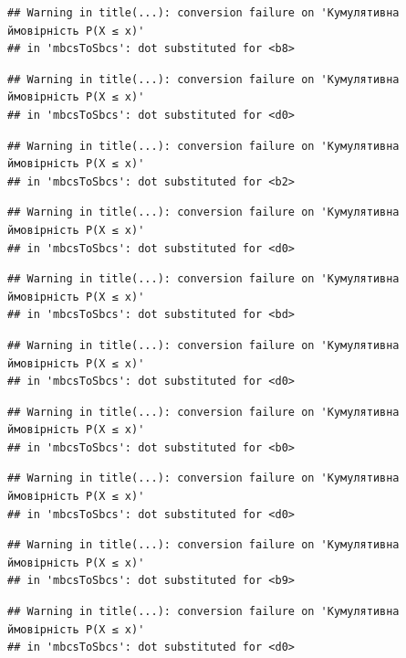 \documentclass[
  11pt,
]{book}
\begin{document}
\begin{verbatim}
## Warning in title(...): conversion failure on 'Кумулятивна ймовірність P(X ≤ x)'
## in 'mbcsToSbcs': dot substituted for <b8>
\end{verbatim}

\begin{verbatim}
## Warning in title(...): conversion failure on 'Кумулятивна ймовірність P(X ≤ x)'
## in 'mbcsToSbcs': dot substituted for <d0>
\end{verbatim}

\begin{verbatim}
## Warning in title(...): conversion failure on 'Кумулятивна ймовірність P(X ≤ x)'
## in 'mbcsToSbcs': dot substituted for <b2>
\end{verbatim}

\begin{verbatim}
## Warning in title(...): conversion failure on 'Кумулятивна ймовірність P(X ≤ x)'
## in 'mbcsToSbcs': dot substituted for <d0>
\end{verbatim}

\begin{verbatim}
## Warning in title(...): conversion failure on 'Кумулятивна ймовірність P(X ≤ x)'
## in 'mbcsToSbcs': dot substituted for <bd>
\end{verbatim}

\begin{verbatim}
## Warning in title(...): conversion failure on 'Кумулятивна ймовірність P(X ≤ x)'
## in 'mbcsToSbcs': dot substituted for <d0>
\end{verbatim}

\begin{verbatim}
## Warning in title(...): conversion failure on 'Кумулятивна ймовірність P(X ≤ x)'
## in 'mbcsToSbcs': dot substituted for <b0>
\end{verbatim}

\begin{verbatim}
## Warning in title(...): conversion failure on 'Кумулятивна ймовірність P(X ≤ x)'
## in 'mbcsToSbcs': dot substituted for <d0>
\end{verbatim}

\begin{verbatim}
## Warning in title(...): conversion failure on 'Кумулятивна ймовірність P(X ≤ x)'
## in 'mbcsToSbcs': dot substituted for <b9>
\end{verbatim}

\begin{verbatim}
## Warning in title(...): conversion failure on 'Кумулятивна ймовірність P(X ≤ x)'
## in 'mbcsToSbcs': dot substituted for <d0>
\end{verbatim}
\end{document}
